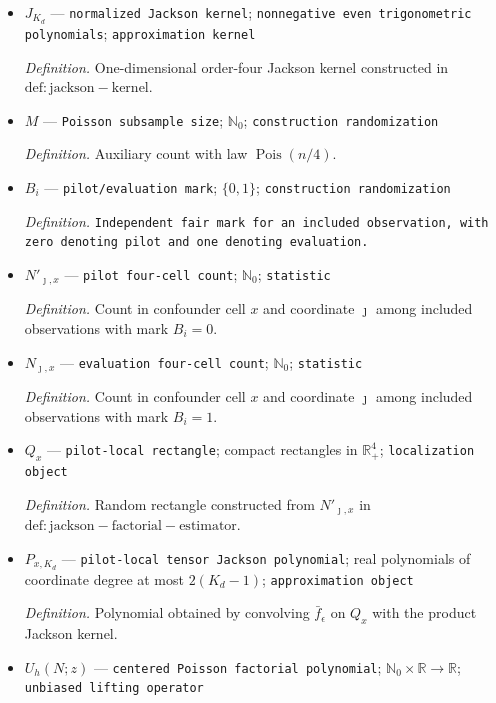 \documentclass{article}
\begin{document}
\begin{itemize}
  \par\smallskip\noindent\emph{Definition.} \(K_d=\max\{2,\lfloor\kappa L_d\rfloor\}\).
  \item \(J_{K_d}\) --- \texttt{normalized Jackson kernel}; \texttt{nonnegative even trigonometric polynomials}; \texttt{approximation kernel}
  \par\smallskip\noindent\emph{Definition.} One-dimensional order-four Jackson kernel constructed in \(\mathrm{def:jackson-kernel}\).
  \item \(M\) --- \texttt{Poisson subsample size}; \(\mathbb N_0\); \texttt{construction randomization}
  \par\smallskip\noindent\emph{Definition.} Auxiliary count with law \(\operatorname{Pois}(n/4)\).
  \item \(B_i\) --- \texttt{pilot/\allowbreak{}evaluation mark}; \(\{0,1\}\); \texttt{construction randomization}
  \par\smallskip\noindent\emph{Definition.} \texttt{Independent fair mark for an included observation,\allowbreak{} with zero denoting pilot and one denoting evaluation.}
  \item \(N'_{\jmath,x}\) --- \texttt{pilot four-\allowbreak{}cell count}; \(\mathbb N_0\); \texttt{statistic}
  \par\smallskip\noindent\emph{Definition.} Count in confounder cell \(x\) and coordinate \(\jmath\) among included observations with mark \(B_i=0\).
  \item \(N_{\jmath,x}\) --- \texttt{evaluation four-\allowbreak{}cell count}; \(\mathbb N_0\); \texttt{statistic}
  \par\smallskip\noindent\emph{Definition.} Count in confounder cell \(x\) and coordinate \(\jmath\) among included observations with mark \(B_i=1\).
  \item \(Q_x\) --- \texttt{pilot-\allowbreak{}local rectangle}; compact rectangles in \(\mathbb R_+^4\); \texttt{localization object}
  \par\smallskip\noindent\emph{Definition.} Random rectangle constructed from \(N'_{\jmath,x}\) in \(\mathrm{def:jackson-factorial-estimator}\).
  \item \(P_{x,K_d}\) --- \texttt{pilot-\allowbreak{}local tensor Jackson polynomial}; real polynomials of coordinate degree at most \(2(K_d-1)\); \texttt{approximation object}
  \par\smallskip\noindent\emph{Definition.} Polynomial obtained by convolving \(\bar f_\epsilon\) on \(Q_x\) with the product Jackson kernel.
  \item \(U_h(N;z)\) --- \texttt{centered Poisson factorial polynomial}; \(\mathbb N_0\times\mathbb R\to\mathbb R\); \texttt{unbiased lifting operator}

\end{itemize}
\end{document}
